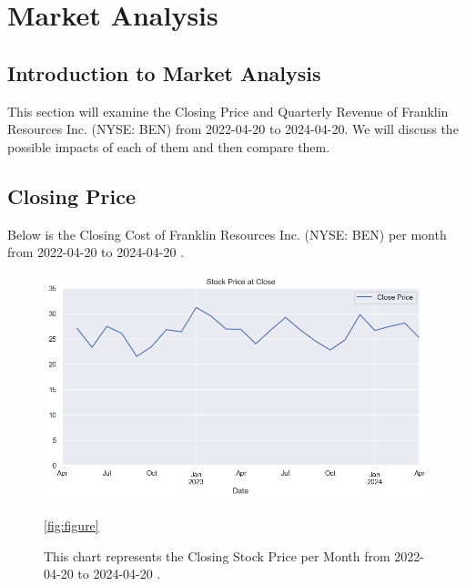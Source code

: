 \documentclass[9pt,a4paper,twoside]{tau}
\begin{document}
\section{Market Analysis}
    \subsection{Introduction to Market Analysis}
        
        This section will examine the Closing Price and Quarterly Revenue of Franklin Resources Inc. (NYSE: BEN) from 2022-04-20 to 2024-04-20. We will discuss the possible impacts of each of them and then compare them.
    
    \subsection{Closing Price}
        
        Below is the Closing Cost of Franklin Resources Inc. (NYSE: BEN) per month from 2022-04-20 to 2024-04-20 \cite{yahoo-finance-2024}.
            \begin{figure}[H]
                \centering
                \includegraphics[width=0.85\columnwidth]{Figures/CloseDataSet1mo.png}
                \caption{This chart represents the Closing Stock Price per Month from 2022-04-20 to 2024-04-20 \cite{yahoo-finance-2024}.}
                \ref{fig:figure}
            \end{figure}
        
\end{document}
